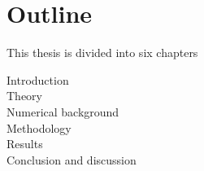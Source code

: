 \section{Outline}

This thesis is divided into six chapters
\begin{description}
\item[Introduction]
\item[Theory]
\item[Numerical background]
\item[Methodology]
\item[Results]
\item[Conclusion and discussion]
\end{description}

 \\
 \\
 \\
 \\
